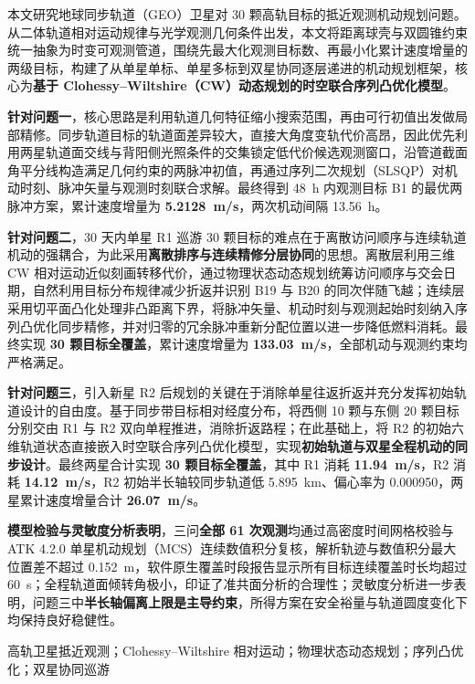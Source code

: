 本文研究地球同步轨道（GEO）卫星对 30 颗高轨目标的抵近观测机动规划问题。从二体轨道相对运动规律与光学观测几何条件出发，本文将距离球壳与双圆锥约束统一抽象为时变可观测管道，围绕先最大化观测目标数、再最小化累计速度增量的两级目标，构建了从单星单标、单星多标到双星协同逐层递进的机动规划框架，核心为\textbf{基于 Clohessy--Wiltshire（CW）动态规划的时空联合序列凸优化模型}。

\textbf{针对问题一}，核心思路是利用轨道几何特征缩小搜索范围，再由可行初值出发做局部精修。同步轨道目标的轨道面差异较大，直接大角度变轨代价高昂，因此优先利用两星轨道面交线与背阳侧光照条件的交集锁定低代价候选观测窗口，沿管道截面角平分线构造满足几何约束的两脉冲初值，再通过序列二次规划（SLSQP）对机动时刻、脉冲矢量与观测时刻联合求解。最终得到 48~h 内观测目标 B1 的最优两脉冲方案，累计速度增量为 \textbf{5.2128~m/s}，两次机动间隔 13.56~h。

\textbf{针对问题二}，30 天内单星 R1 巡游 30 颗目标的难点在于离散访问顺序与连续轨道机动的强耦合，为此采用\textbf{离散排序与连续精修分层协同}的思想。离散层利用三维 CW 相对运动近似刻画转移代价，通过物理状态动态规划统筹访问顺序与交会日期，自然利用目标分布规律减少折返并识别 B19 与 B20 的同次伴随飞越；连续层采用切平面凸化处理非凸距离下界，将脉冲矢量、机动时刻与观测起始时刻纳入序列凸优化同步精修，并对归零的冗余脉冲重新分配位置以进一步降低燃料消耗。最终实现 \textbf{30 颗目标全覆盖}，累计速度增量为 \textbf{133.03~m/s}，全部机动与观测约束均严格满足。

\textbf{针对问题三}，引入新星 R2 后规划的关键在于消除单星往返折返并充分发挥初始轨道设计的自由度。基于同步带目标相对经度分布，将西侧 10 颗与东侧 20 颗目标分别交由 R1 与 R2 双向单程推进，消除折返路程；在此基础上，将 R2 的初始六维轨道状态直接嵌入时空联合序列凸优化模型，实现\textbf{初始轨道与双星全程机动的同步设计}。最终两星合计实现 \textbf{30 颗目标全覆盖}，其中 R1 消耗 \textbf{11.94~m/s}，R2 消耗 \textbf{14.12~m/s}，R2 初始半长轴较同步轨道低 5.895~km、偏心率为 0.000950，两星累计速度增量合计 \textbf{26.07~m/s}。

\textbf{模型检验与灵敏度分析表明}，三问\textbf{全部 61 次观测}均通过高密度时间网格校验与 ATK 4.2.0 单星机动规划（MCS）连续数值积分复核，解析轨迹与数值积分最大位置差不超过 0.152~m，软件原生覆盖时段报告显示所有目标连续覆盖时长均超过 60~s；全程轨道面倾转角极小，印证了准共面分析的合理性；灵敏度分析进一步表明，问题三中\textbf{半长轴偏离上限是主导约束}，所得方案在安全裕量与轨道圆度变化下均保持良好稳健性。

\vspace{4pt}
高轨卫星抵近观测；Clohessy--Wiltshire 相对运动；物理状态动态规划；序列凸优化；双星协同巡游

